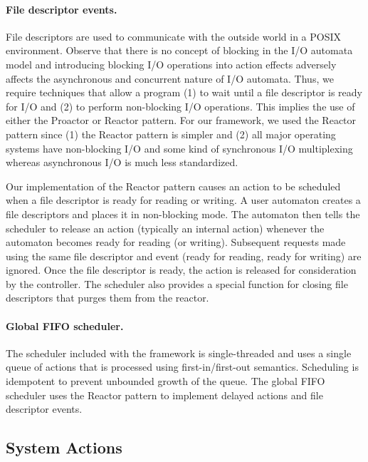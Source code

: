 \paragraph{File descriptor events.}
File descriptors are used to communicate with the outside world in a POSIX environment.
Observe that there is no concept of blocking in the I/O automata model and introducing blocking I/O operations into action effects adversely affects the asynchronous and concurrent nature of I/O automata.
Thus, we require techniques that allow a program (1) to wait until a file descriptor is ready for I/O and (2) to perform non-blocking I/O operations.
This implies the use of either the Proactor or Reactor pattern.
For our framework, we used the Reactor pattern since (1) the Reactor pattern is simpler and (2) all major operating systems have non-blocking I/O and some kind of synchronous I/O multiplexing whereas asynchronous I/O is much less standardized.

Our implementation of the Reactor pattern causes an action to be scheduled when a file descriptor is ready for reading or writing.
A user automaton creates a file descriptors and places it in non-blocking mode.
The automaton then tells the scheduler to release an action (typically an internal action) whenever the automaton becomes ready for reading (or writing).
Subsequent requests made using the same file descriptor and event (ready for reading, ready for writing) are ignored.
Once the file descriptor is ready, the action is released for consideration by the controller.
The scheduler also provides a special function for closing file descriptors that purges them from the reactor.

\paragraph{Global FIFO scheduler.}
The scheduler included with the framework is single-threaded and uses a single queue of actions that is processed using first-in/first-out semantics.
Scheduling is idempotent to prevent unbounded growth of the queue.
The global FIFO scheduler uses the Reactor pattern to implement delayed actions and file descriptor events.

\subsection{System Actions}

